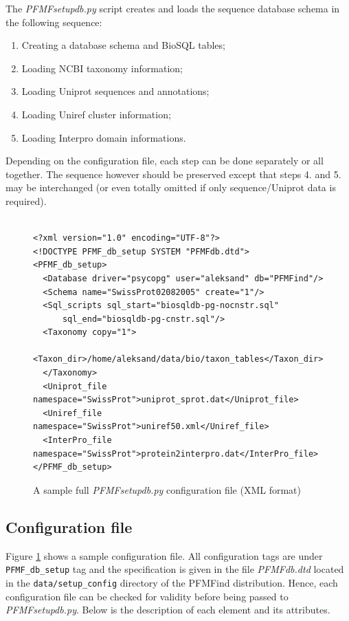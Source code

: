 \documentclass[10pt,letter]{article}
\begin{document}
The {\it PFMFsetupdb.py} script creates and loads the sequence database schema in the following sequence:
\begin{enumerate}
\item Creating a database schema and BioSQL tables;
\item Loading NCBI taxonomy information;
\item Loading Uniprot sequences and annotations;
\item Loading Uniref cluster information;
\item Loading Interpro domain informations.
\end{enumerate}
Depending on the configuration file, each step can be done separately or all together. The sequence however should be preserved except that steps 4. and 5. may be interchanged (or even totally omitted if only sequence/Uniprot data is required).



\begin{figure}[h!]
\begin{mdframed}
{\small
\begin{verbatim}

<?xml version="1.0" encoding="UTF-8"?>
<!DOCTYPE PFMF_db_setup SYSTEM "PFMFdb.dtd">
<PFMF_db_setup>
  <Database driver="psycopg" user="aleksand" db="PFMFind"/>
  <Schema name="SwissProt02082005" create="1"/>
  <Sql_scripts sql_start="biosqldb-pg-nocnstr.sql" 
      sql_end="biosqldb-pg-cnstr.sql"/>
  <Taxonomy copy="1">
  <Taxon_dir>/home/aleksand/data/bio/taxon_tables</Taxon_dir>
  </Taxonomy>
  <Uniprot_file namespace="SwissProt">uniprot_sprot.dat</Uniprot_file>
  <Uniref_file namespace="SwissProt">uniref50.xml</Uniref_file>
  <InterPro_file namespace="SwissProt">protein2interpro.dat</InterPro_file>
</PFMF_db_setup>
\end{verbatim}
}
\caption{A sample full {\it PFMFsetupdb.py} configuration file (XML format)}\label{fig:config}
\end{mdframed}
\end{figure}

\subsection{Configuration file}\label{sec:dbconfig}

Figure \ref{fig:config} shows a sample configuration file. All configuration tags are under \texttt{ PFMF\_db\_setup} tag and the specification is given in the file {\it PFMFdb.dtd} located in the \verb|data/setup_config| directory of the PFMFind distribution. Hence, each configuration file can be checked for validity before being passed to {\it PFMFsetupdb.py}. Below is the description of each element and its attributes.
\end{document}
